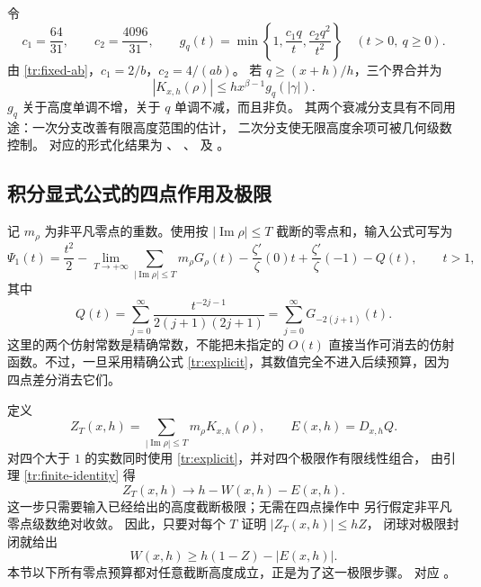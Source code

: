 令
\begin{equation}\label{tr:height-kernel}
 c_1=\frac{64}{31},\qquad c_2=\frac{4096}{31},\qquad
 g_q(t)=\min\left\{1,\frac{c_1q}{t},\frac{c_2q^2}{t^2}\right\}
 \quad(t>0,\ q\geq0).
\end{equation}
由 \eqref{tr:fixed-ab}，$c_1=2/b$，$c_2=4/(ab)$。
若 $q\geq(x+h)/h$，三个界合并为
\begin{equation}\label{tr:kernel-min}
 |K_{x,h}(\rho)|\leq h x^{\beta-1}g_q(|\gamma|).
\end{equation}
$g_q$ 关于高度单调不增，关于 $q$ 单调不减，而且非负。
其两个衰减分支具有不同用途：一次分支改善有限高度范围的估计，
二次分支使无限高度余项可被几何级数控制。
对应的形式化结果为
、
、
及 。

\subsection{积分显式公式的四点作用及极限}

记 $m_\rho$ 为非平凡零点的重数。使用按
$|\operatorname{Im}\rho|\leq T$ 截断的零点和，输入公式可写为
\begin{equation}\label{tr:explicit}
 \Psi_1(t)=\frac{t^2}{2}
 -\lim_{T\to+\infty}
   \sum_{|\operatorname{Im}\rho|\leq T}m_\rho G_\rho(t)
 -\frac{\zeta'}{\zeta}(0)t+\frac{\zeta'}{\zeta}(-1)-Q(t),
 \qquad t>1,
\end{equation}
其中
\begin{equation}\label{tr:trivial-primitive}
 Q(t)=\sum_{j=0}^{\infty}
       \frac{t^{-2j-1}}{2(j+1)(2j+1)}
     =\sum_{j=0}^{\infty}G_{-2(j+1)}(t).
\end{equation}
这里的两个仿射常数是精确常数，不能把未指定的 $O(t)$
直接当作可消去的仿射函数。不过，一旦采用精确公式
\eqref{tr:explicit}，其数值完全不进入后续预算，因为四点差分消去它们。

定义
\[
 Z_T(x,h)=\sum_{|\operatorname{Im}\rho|\leq T}
                  m_\rho K_{x,h}(\rho),\qquad E(x,h)=D_{x,h}Q .
\]
对四个大于 $1$ 的实数同时使用 \eqref{tr:explicit}，并对四个极限作有限线性组合，
由引理 \ref{tr:finite-identity} 得
\begin{equation}\label{tr:zero-limit}
 Z_T(x,h)\longrightarrow h-W(x,h)-E(x,h).
\end{equation}
这一步只需要输入已经给出的高度截断极限；无需在四点操作中
另行假定非平凡零点级数绝对收敛。
因此，只要对每个 $T$ 证明 $|Z_T(x,h)|\leq hZ$，
闭球对极限封闭就给出
\begin{equation}\label{tr:weighted-lower}
 W(x,h)\geq h(1-Z)-|E(x,h)|.
\end{equation}
本节以下所有零点预算都对任意截断高度成立，正是为了这一极限步骤。
对应
。


